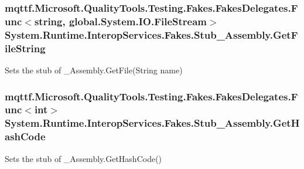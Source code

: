 \hypertarget{class_system_1_1_runtime_1_1_interop_services_1_1_fakes_1_1_stub___assembly_a225f29a4f42a848b5331d6b6661bcbef}{
\subsubsection[{Get\-File\-String}]{\setlength{\rightskip}{0pt plus 5cm}mqttf.\-Microsoft.\-Quality\-Tools.\-Testing.\-Fakes.\-Fakes\-Delegates.\-Func$<$string, global.\-System.\-I\-O.\-File\-Stream$>$ System.\-Runtime.\-Interop\-Services.\-Fakes.\-Stub\-\_\-\-Assembly.\-Get\-File\-String}}\label{class_system_1_1_runtime_1_1_interop_services_1_1_fakes_1_1_stub___assembly_a225f29a4f42a848b5331d6b6661bcbef}


Sets the stub of \-\_\-\-Assembly.\-Get\-File(\-String name)

\hypertarget{class_system_1_1_runtime_1_1_interop_services_1_1_fakes_1_1_stub___assembly_a24a8ec84805236584d60ce11dfde2498}{
\subsubsection[{Get\-Hash\-Code}]{\setlength{\rightskip}{0pt plus 5cm}mqttf.\-Microsoft.\-Quality\-Tools.\-Testing.\-Fakes.\-Fakes\-Delegates.\-Func$<$int$>$ System.\-Runtime.\-Interop\-Services.\-Fakes.\-Stub\-\_\-\-Assembly.\-Get\-Hash\-Code}}\label{class_system_1_1_runtime_1_1_interop_services_1_1_fakes_1_1_stub___assembly_a24a8ec84805236584d60ce11dfde2498}


Sets the stub of \-\_\-\-Assembly.\-Get\-Hash\-Code()

